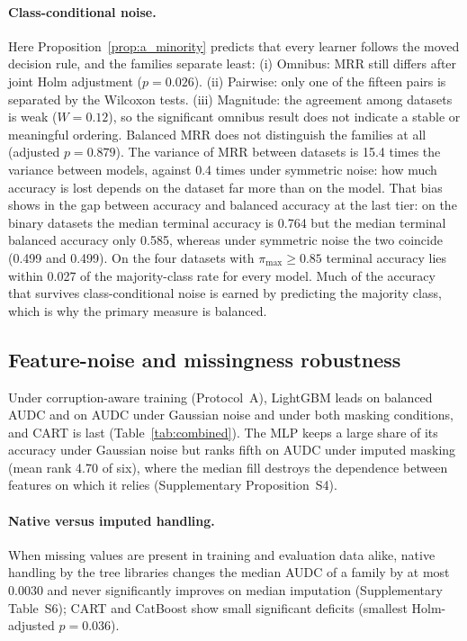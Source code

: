 \documentclass[pdflatex,sn-mathphys]{sn-jnl}
\theoremstyle{thmstyleone}
\theoremstyle{thmstyletwo}
\theoremstyle{thmstylethree}
\begin{document}
\paragraph{Class-conditional noise.} Here Proposition~\ref{prop:a_minority} predicts that every learner follows the moved decision rule, and the families separate least: (i) Omnibus: MRR still differs after joint Holm adjustment ($p=0.026$). (ii) Pairwise: only one of the fifteen pairs is separated by the Wilcoxon tests. (iii) Magnitude: the agreement among datasets is weak ($W=0.12$), so the significant omnibus result does not indicate a stable or meaningful ordering. Balanced MRR does not distinguish the families at all (adjusted $p=0.879$). The variance of MRR between datasets is 15.4 times the variance between models, against 0.4 times under symmetric noise: how much accuracy is lost depends on the dataset far more than on the model. That bias shows in the gap between accuracy and balanced accuracy at the last tier: on the binary datasets the median terminal accuracy is 0.764 but the median terminal balanced accuracy only 0.585, whereas under symmetric noise the two coincide (0.499 and 0.499). On the four datasets with $\pi_{\max}\ge0.85$ terminal accuracy lies within 0.027 of the majority-class rate for every model. Much of the accuracy that survives class-conditional noise is earned by predicting the majority class, which is why the primary measure is balanced.

\subsection{Feature-noise and missingness robustness}\label{sec:res:feature}

Under corruption-aware training (Protocol~A), LightGBM leads on balanced AUDC and on AUDC under Gaussian noise and under both masking conditions, and CART is last (Table~\ref{tab:combined}). The MLP keeps a large share of its accuracy under Gaussian noise but ranks fifth on AUDC under imputed masking (mean rank 4.70 of six), where the median fill destroys the dependence between features on which it relies (Supplementary Proposition~S4).

\paragraph{Native versus imputed handling.} When missing values are present in training and evaluation data alike, native handling by the tree libraries changes the median AUDC of a family by at most $0.0030$ and never significantly improves on median imputation (Supplementary Table~S6); CART and CatBoost show small significant deficits (smallest Holm-adjusted $p=0.036$).
\end{document}

